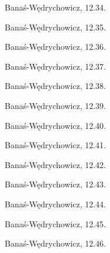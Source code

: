 \begin{integral}
    Banaś-Wędrychowicz, 12.34.
\end{integral}

\begin{integral}
    Banaś-Wędrychowicz, 12.35.
\end{integral}

\begin{integral}
    Banaś-Wędrychowicz, 12.36.
\end{integral}

\begin{integral}
    Banaś-Wędrychowicz, 12.37.
\end{integral}

\begin{integral}
    Banaś-Wędrychowicz, 12.38.
\end{integral}

\begin{integral}
    Banaś-Wędrychowicz, 12.39.
\end{integral}

\begin{integral}
    Banaś-Wędrychowicz, 12.40.
\end{integral}

\begin{integral}
    Banaś-Wędrychowicz, 12.41.
\end{integral}

\begin{integral}
    Banaś-Wędrychowicz, 12.42.
\end{integral}

\begin{integral}
    Banaś-Wędrychowicz, 12.43.
\end{integral}

\begin{integral}
    Banaś-Wędrychowicz, 12.44.
\end{integral}

\begin{integral}
    Banaś-Wędrychowicz, 12.45.
\end{integral}

\begin{integral}
    Banaś-Wędrychowicz, 12.46.
\end{integral}

